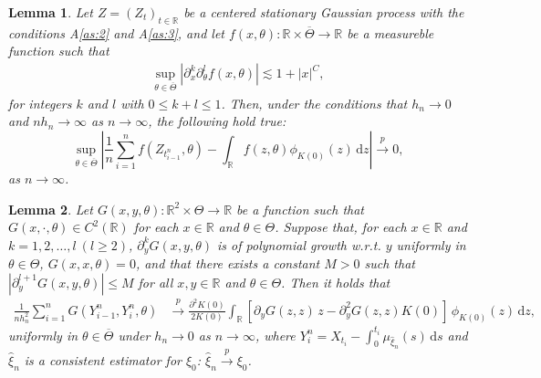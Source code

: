\documentclass[10pt,a4paper]{amsart}
\newtheorem{lem}{Lemma}
\def\R{\mathbb{R}}
\def\df{\mathrm{d}}
\def\l{\left}
\def\ol#1{\overline{#1}}
\def\p{\partial}
\def\r{\right}
\def\th{\theta}
\def\toP{\stackrel{p}{\longrightarrow}}
\def\wh#1{\widehat{#1}}
\begin{document}
\begin{lem}\label{lem:ergod}
Let $Z = (Z_t)_{t \in \mathbb{R}}$ be a centered stationary Gaussian process with the conditions A\ref{as:2} and  A\ref{as:3}, and 
let $f(x,\th): \R\times \ol{\Theta} \to \R$ be a measureble function such that 
\begin{align}
\sup_{\th \in \ol{\Theta}}|\p_x^k \p_\th^l f(x,\th)| \lesssim 1 + |x|^C, \label{cond:ergod}
\end{align}
for integers $k$ and $l$ with $0\le k+l\le 1$. 
Then, under the conditions that $h_n \to 0$ and $nh_n\to \infty$ as $n\to \infty$, the following hold true:
\[
\sup_{\th \in \ol{\Theta}}\l|\frac{1}{n} \sum_{i=1}^n f(Z_{t_{i-1}^n},\th) - \int_\R f(z,\th)\phi_{K(0)}(z)\,\df z\r|\toP 0,
\]
as $n\to \infty$. 
\end{lem}

\begin{lem}\label{lem:GY}
Let $G(x,y,\th) :\R^2\times \Theta\to \R$ be a function such that $G(x,\cdot,\th)\in C^2(\R)$ for each $x\in \R$ and $\th\in \Theta$.
Suppose that, for each $x\in \R$ and $k=1,2,\dots, l \ (l\ge 2)$, $\p_y^kG(x,y,\th)$ is of polynomial growth w.r.t. $y$ uniformly in $\th\in \Theta$, $G(x,x,\th) = 0$, and that  there exists a constant $M>0$ such that $|\p_y^{l+1}G(x,y,\th)| \le M$ for all $x,y\in \R$ and $\th \in \Theta$. Then it holds that 
\begin{align*}
\frac{1}{nh_n^2}\sum_{i=1}^n G(Y^n_{i-1}, Y_i^n,\th)
&\toP  \frac{\p^2 K(0)}{2 K(0)}  \int_\R \l[\p_y G(z,z)\,z - \p_y^2 G(z, z)K(0)\r] \, \phi_{K(0)}(z)\,\df z,
\end{align*}
uniformly in $\th \in \ol{\Theta}$ under $h_n\to 0$ as $n\to \infty$, where $Y_i^n= X_{t_i} - \int_0^{t_i} \mu_{\wh{\xi}_n}(s)\,\df s$ and 
$\wh{\xi}_n$ is a consistent estimator for $\xi_0$: $\wh{\xi}_n\toP \xi_0$. 
\end{lem}
\end{document}
